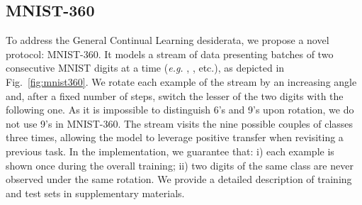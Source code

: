 \documentclass{article}
\begin{document}
\subsection{MNIST-360}
\label{subsec:gcl_exp_setup}
To address the General Continual Learning desiderata, we propose a novel protocol: MNIST-360. It models a stream of data presenting batches of two consecutive MNIST digits at a time (\textit{e.g.} , ,  etc.), as depicted in Fig.~\ref{fig:mnist360}. We rotate each example of the stream by an increasing angle and, after a fixed number of steps, switch the lesser of the two digits with the following one. As it is impossible to distinguish 6's and 9's upon rotation, we do not use 9's in MNIST-360. The stream visits the nine possible couples of classes three times, allowing the model to leverage positive transfer when revisiting a previous task. In the implementation, we guarantee that: i) each example is shown once during the overall training; ii) two digits of the same class are never observed under the same rotation. We provide a detailed description of training and test sets in supplementary materials.
\end{document}
